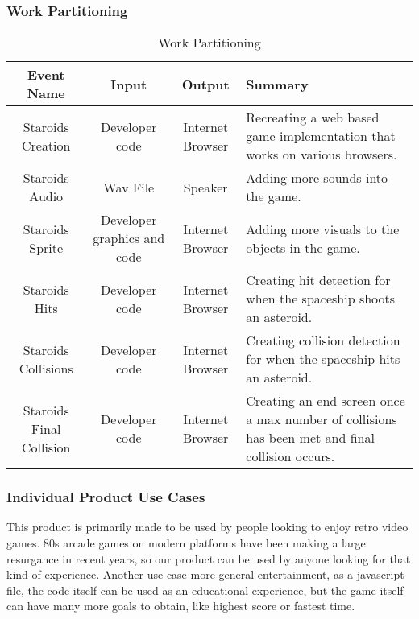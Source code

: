 \documentclass[12pt, titlepage]{article}
\begin{document}
\subsubsection{Work Partitioning}
	\begin{table}[H]
	\caption{Work Partitioning}
		\begin{adjustwidth}{-2.75cm}{}
	\begin{tabular}{|c|c|c|p{5cm}|}
	\hline
	Event Name & Input & Output & Summary\\
	\hline
	Staroids Creation & Developer code & Internet Browser & Recreating a web based game implementation that works on various browsers.\\
	\hline
	Staroids Audio & Wav File & Speaker & Adding more sounds into the game.\\
	\hline
	Staroids Sprite & Developer graphics and code & Internet Browser & Adding more visuals to the objects in the game.\\
	\hline
	Staroids Hits & Developer code & Internet Browser & Creating hit detection for when the spaceship shoots an asteroid. \\
	\hline
	Staroids Collisions & Developer code & Internet Browser & Creating collision detection for when the spaceship hits an asteroid.\\
	\hline
	Staroids Final Collision & Developer code & Internet Browser & Creating an end screen once a max number of collisions has been met and final collision occurs.\\
	\hline
  \end{tabular}
		\end{adjustwidth}
	\end{table}

\subsubsection{Individual Product Use Cases}
This product is primarily made to be used by people looking to enjoy retro video games. 80s arcade games on modern platforms have been making a large resurgance in recent years, so our product can be used by anyone looking for that kind of experience. Another use case more general entertainment, as a javascript file, the code itself can be used as an educational experience, but the game itself can have many more goals to obtain, like highest score or fastest time.\\
\end{document}
